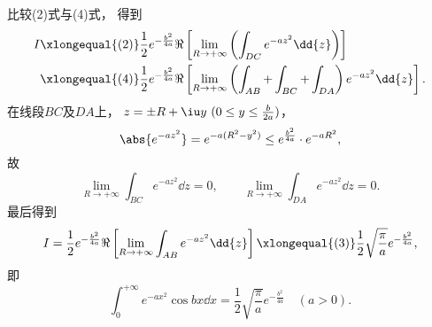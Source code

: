 \begin{example}
\begin{solution}
比较(2)式与(4)式，
得到\begin{align*}
	I &\xlongequal{\rm(2)}
		\frac{1}{2} e^{-\frac{b^2}{4a}}
		\Re\left[
			\lim_{R\to+\infty}
			\left( \int_{DC} e^{-az^2} \dd{z} \right)
		\right] \\
	&\xlongequal{\rm(4)}
		\frac{1}{2} e^{-\frac{b^2}{4a}}
		\Re\left[
			\lim_{R\to+\infty}
			\left( \int_{AB} + \int_{BC} + \int_{DA}\right)
			e^{-az^2} \dd{z}
		\right].
\end{align*}
在线段\(BC\)及\(DA\)上，
\(z=\pm R+\iu y\ (0 \leq y \leq \frac{b}{2a})\)，
\[
	\abs{e^{-az^2}}
	= e^{-a(R^2-y^2)}
	\leq e^{\frac{b^2}{4a}} \cdot e^{-aR^2},
\]
故\[
	\lim_{R\to+\infty} \int_{BC} e^{-az^2} \dd{z} = 0,
	\qquad
	\lim_{R\to+\infty} \int_{DA} e^{-az^2} \dd{z} = 0.
\]
最后得到\[
	I = \frac{1}{2} e^{-\frac{b^2}{4a}} \Re\left[ \lim_{R\to+\infty} \int_{AB} e^{-az^2} \dd{z} \right]
	\xlongequal{\rm(3)} \frac{1}{2} \sqrt{\frac{\pi}{a}} e^{-\frac{b^2}{4a}},
\]
即\begin{equation}\label{equation:留数定理.泊松积分}
	\int_0^{+\infty} e^{-ax^2} \cos bx \dd{x}
	= \frac{1}{2} \sqrt{\frac{\pi}{a}} e^{-\frac{b^2}{4a}}
	\quad(a>0).
\end{equation}
\end{solution}
\end{example}


